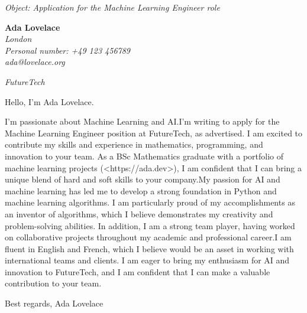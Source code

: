 \documentclass[12pt]{letter}
\begin{document}
\begin{letter}{ \itshape Object: Application for the Machine Learning Engineer role }
\hfill
\begin{flushleft}
    {\bfseries Ada Lovelace }\\[.35ex]
    \small\itshape
    London\\
    Personal number: +49 123 456789\\
    ada@lovelace.org
\end{flushleft}

\hfill
\begin{flushright}
    \itshape FutureTech \\
\end{flushright}

\opening{ Hello, I'm Ada Lovelace. }

I'm passionate about Machine Learning and AI.I'm writing to apply for the Machine Learning Engineer position at FutureTech, as advertised. I am excited to contribute my skills and experience in mathematics, programming, and innovation to your team. As a BSc Mathematics graduate with a portfolio of machine learning projects (<https://ada.dev>), I am confident that I can bring a unique blend of hard and soft skills to your company.My passion for AI and machine learning has led me to develop a strong foundation in Python and machine learning algorithms. I am particularly proud of my accomplishments as an inventor of algorithms, which I believe demonstrates my creativity and problem-solving abilities. In addition, I am a strong team player, having worked on collaborative projects throughout my academic and professional career.I am fluent in English and French, which I believe would be an asset in working with international teams and clients. I am eager to bring my enthusiasm for AI and innovation to FutureTech, and I am confident that I can make a valuable contribution to your team.

\closing{ Best regards, Ada Lovelace }

\end{letter}
\end{document}
